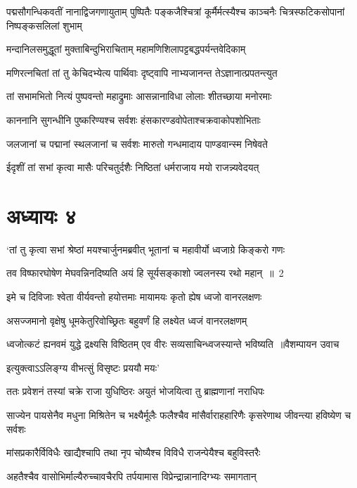 \threelineshloka
{पद्मसौगन्धिकवतीं नानाद्विजगणायुताम्}
{पुष्पितैः पङ्कजैश्चित्रां कूर्मैर्मत्स्यैश्च काञ्चनैः}
{चित्रस्फटिकसोपानां निष्पङ्कसलिलां शुभाम्}


\twolineshloka
{मन्दानिलसमुद्धूतां मुक्ताबिन्दुभिराचिताम्}
{महामणिशिलापट्टबद्धपर्यन्तवेदिकाम्}


\twolineshloka
{मणिरत्नचितां तां तु केचिदभ्येत्य पार्थिवाः}
{दृष्ट्वापि नाभ्यजानन्त तेऽज्ञानात्प्रपतन्त्युत}


\twolineshloka
{तां सभामभितो नित्यं पुष्पवन्तो महाद्रुमाः}
{आसन्नानाविधा लोलाः शीतच्छाया मनोरमाः}


\twolineshloka
{काननानि सुगन्धीनि पुष्करिण्यश्च सर्वशः}
{हंसकारण्डवोपेताश्चक्रवाकोपशोभिताः}


\twolineshloka
{जलजानां च पद्मानां स्थलजानां च सर्वशः}
{मारुतो गन्धमादाय पाण्डवान्स्म निषेवते}


\twolineshloka
{ईदृशीं तां सभां कृत्वा मासैः परिचतुर्दशैः}
{निष्ठितां धर्मराजाय मयो राजन्न्यवेदयत्}


\chapter{अध्यायः ४}
\twolineshloka
{`तां तु कृत्वा सभां श्रेष्ठां मयश्चार्जुनमब्रवीत्}
{भूतानां च महावीर्यो ध्वजाग्रे किङ्करो गणः}


\twolineshloka
{तव विष्फारघोषेण मेघवन्निनदिष्यति}
{अयं हि सूर्यसङ्काशो ज्वलनस्य रथो महान् ॥ 2}


\twolineshloka
{इमे च दिविजाः श्वेता वीर्यवन्तो हयोत्तमाः}
{मायामयः कृतो ह्येष ध्वजो वानरलक्षणः}


\twolineshloka
{असज्जमानो वृक्षेषु धूमकेतुरिवोच्छ्रितः}
{बहुवर्णं हि लक्ष्येत ध्वजं वानरलक्षणम्}


\threelineshloka
{ध्वजोत्कटं ह्यनवमं युद्धे द्रक्ष्यसि विष्ठितम्}
{एव वीरः सव्यसाचिन्ध्वजस्यान्ते भविष्यति ॥वैशम्पायन उवाच}
{}


\twolineshloka
{इत्युक्त्वाऽऽलिङ्ग्य वीभत्सुं विसृष्टः प्रययौ मयः'}
{}


\twolineshloka
{ततः प्रवेशनं तस्यां चक्रे राजा युधिष्ठिरः}
{अयुतं भोजयित्वा तु ब्राह्मणानां नराधिपः}


\threelineshloka
{साज्येन पायसेनैव मधुना मिश्रितेन च}
{भक्ष्यैर्मूलैः फलैश्चैव मांसैर्वाराहहारिणैः}
{कृसरेणाथ जीवन्त्या हविष्येण च सर्वशः}


\twolineshloka
{मांसप्रकारैर्विविधैः खाद्यैश्चापि तथा नृप}
{चोष्यैश्च विविधै राजन्पेयैश्च बहुविस्तरैः}


\twolineshloka
{अहतैश्चैव वासोभिर्माल्यैरुच्चावचैरपि}
{तर्पयामास विप्रेन्द्रान्नानादिग्भ्यः समागतान्}


